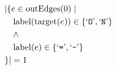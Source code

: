 \begin{align*}
&|\{e \in \mathrm{outEdges}(0)  \mid \\
&\quad \mathrm{label}(\mathrm{target}(e)) \in \{ \text{`\texttt{O}'},  \text{`\texttt{N}'} \}\\
&\quad \wedge\\
&\quad \mathrm{label}(e) \in \{ \text{`\texttt{=}'},  \text{`\texttt{-}'} \}\\
&\}| = 1
\end{align*}

